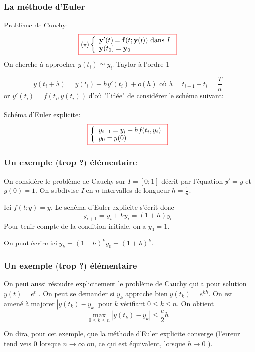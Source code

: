 \documentclass{beamer}
\newcommand{\myredbox}[1]{\fcolorbox{red}{white}{$\displaystyle#1$}}
\begin{document}
 \begin{frame}  
 \frametitle{La méthode d'Euler}  
 Problème de Cauchy:
   \[\myredbox{(\star)\left\{\begin{array}{l}
{\bf y}'(t) = {\bf f}(t; {\bf y}(t)) \mbox{ dans }I\\
{\bf y}(t_0) = {\bf y}_0
\end{array}\right.
}\]
On cherche à approcher $ y(t_i) \simeq y_i $. Taylor à l'ordre 1:

\[y(t_i+h)=y(t_i)+hy'(t_i)+o(h)\mbox{ où } h=t_{i+1} - t_i = \frac Tn \]
or $y'(t_i)=f(t_i,y(t_i))$ d'où "l'idée" de considérer le schéma suivant:
\\
\\
Schéma d'Euler explicite:
\[\myredbox{\left\{\begin{array}{l}
y_{i+1}=y_i+h f(t_i,y_i) \\
y_0=y(0)

\end{array}\right.}
\]

 \end{frame}  

\begin{frame}    
   \frametitle{Un exemple (trop ?) élémentaire}
On considère le problème de Cauchy sur $I = [0; 1]$ décrit par l'équation $y' = y$ et $y(0) = 1$.
On subdivise $I$ en $n$ intervalles de longueur $h =\frac 1n$.

Ici $f (t; y) = y$. Le schéma d'Euler explicite s'écrit donc
\[y_{i+1} = y_i + hy_i = (1 + h)y_i\]
Pour tenir compte de la condition initiale, on a $y_0 = 1$.

On peut écrire ici $y_k = (1 + h)^ky_0 = (1 + h)^k$.
 \end{frame}  
\begin{frame}    
\frametitle{Un exemple (trop ?) élémentaire}
On peut aussi résoudre explicitement le problème de Cauchy qui a pour solution $y(t) = e^t$ .
On peut se demander si $y_k$ approche bien $y(t_k) = e^{kh}$.
On est amené à majorer $|y(t_k) - y_k|$ pour $k$ vérifiant $0\leq k \leq n$.
On obtient
\[\max_{0\leq k \leq n}|y(t_k) - y_k|\leq \frac e2h\]

On dira, pour cet exemple, que la méthode d'Euler explicite converge (l'erreur tend vers $0$ lorsque $n\to\infty$ ou, ce qui est équivalent, lorsque $h\to 0$ ).
 \end{frame}  
    
\end{document}

